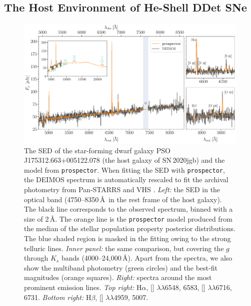 \documentclass[twocolumn]{aastex631}
\newcommand{\sn}{SN\,2020jgb}
\begin{document}
\begin{CJK*}{UTF8}{gbsn}
\subsection{The Host Environment of He-Shell DDet SNe} \label{sec:host}

\begin{figure}
    \centering
    \includegraphics[width=\textwidth]{DEIMOS_20jgb.pdf}
    \caption{The SED of the star-forming dwarf galaxy PSO J175312.663+005122.078 (the host galaxy of \sn) and the model from \texttt{prospector}. When fitting the SED with \texttt{prospector}, the DEIMOS spectrum is automatically rescaled to fit the archival photometry from Pan-STARRS \citep[][$g$, $r$, $i$, $z$, $y$ Kron magnitudes]{PS1_2016} and VHS \citep[][$J$ and $K_s$ Petrosian magnitudes]{VHS_2013}. {\it Left:} the SED in the optical band (4750--8350\,\AA\ in the rest frame of the host galaxy). The black line corresponds to the observed spectrum, binned with a size of 2\,\AA. The orange line is the \texttt{prospector} model produced from the median of the stellar population property posterior distributions. The blue shaded region is masked in the fitting owing to the strong telluric lines. {\it Inner panel:} the same comparison, but covering the $g$ through $K_s$ bands (4000--24,000\,\AA). Apart from the spectra, we also show the multiband photometry (green circles) and the best-fit magnitudes (orange squares). {\it Right:} spectra around the most prominent emission lines. {\it Top right:} H$\alpha$, [] $\lambda\lambda$6548, 6583, [] $\lambda\lambda$6716, 6731. {\it Bottom right:} H$\beta$, [] $\lambda\lambda$4959, 5007.}
    \label{fig:host_spec}
\end{figure}


\end{CJK*}
\end{document}
